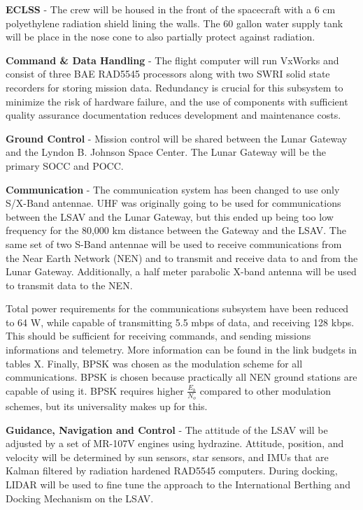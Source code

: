 \documentclass[10pt]{article}
\begin{document}
\textbf{ECLSS} - The crew will be housed in the front of the spacecraft with a 6
cm polyethylene radiation shield lining the walls. The 60 gallon water
supply tank will be place in the nose cone to also partially protect
against radiation.

\textbf{Command \& Data Handling} - The flight computer will run
VxWorks and consist of three BAE RAD5545 processors along with two
SWRI solid state recorders for storing mission data. Redundancy is
crucial for this subsystem to minimize the risk of hardware failure,
and the use of components with sufficient quality assurance
documentation reduces development and maintenance costs.

\textbf{Ground Control} - Mission control will be shared between the Lunar
Gateway and the Lyndon B. Johnson Space Center. The Lunar Gateway will
be the primary SOCC and POCC.

\textbf{Communication} - The communication system has been changed to
use only S/X-Band antennae. UHF was originally going to be used for
communications between the LSAV and the Lunar Gateway, but this ended
up being too low frequency for the 80,000 km distance between the
Gateway and the LSAV. The same set of two S-Band antennae will be used
to receive communications from the Near Earth Network (NEN) and to
transmit and receive data to and from the Lunar Gateway. Additionally,
a half meter parabolic X-band antenna will be used to transmit data to
the NEN.

Total power requirements for the communications subsystem have been
reduced to 64 W, while capable of transmitting 5.5 mbps of data, and
receiving 128 kbps. This should be sufficient for receiving commands,
and sending missions informations and telemetry. More information can
be found in the link budgets in tables X. Finally, BPSK was chosen as
the modulation scheme for all communications. BPSK is chosen because
practically all NEN ground stations are capable of using it. BPSK
requires higher \(\frac{E_b}{N_o}\) compared to other modulation
schemes, but its universality makes up for this.

\textbf{Guidance, Navigation and Control} - The attitude of the LSAV
will be adjusted by a set of MR-107V engines using
hydrazine. Attitude, position, and velocity will be determined by sun
sensors, star sensors, and IMUs that are Kalman filtered by radiation
hardened RAD5545 computers. During docking, LIDAR will be used to fine
tune the approach to the International Berthing and Docking Mechanism
on the LSAV.
\end{document}
